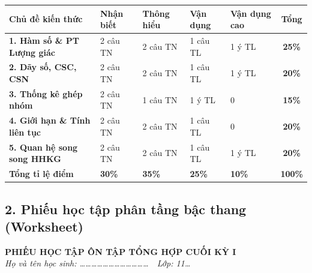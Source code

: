 \documentclass[12pt, a4paper]{article}
\begin{document}
\begin{center}
\renewcommand{\arraystretch}{1.25}
\begin{tabularx}{\textwidth}{|p{4.2cm}|X|X|X|X|c|}
    \hline
    \textbf{Chủ đề kiến thức} & \textbf{Nhận biết} & \textbf{Thông hiểu} & \textbf{Vận dụng} & \textbf{Vận dụng cao} & \textbf{Tổng} \\
    \hline
    \textbf{1. Hàm số \& PT Lượng giác} & 2 câu TN & 2 câu TN & 1 câu TL & 1 ý TL & \textbf{25\%} \\
    \hline
    \textbf{2. Dãy số, CSC, CSN} & 2 câu TN & 2 câu TN & 1 câu TL & 1 ý TL & \textbf{20\%} \\
    \hline
    \textbf{3. Thống kê ghép nhóm} & 2 câu TN & 1 câu TN & 1 ý TL & 0 & \textbf{15\%} \\
    \hline
    \textbf{4. Giới hạn \& Tính liên tục} & 2 câu TN & 2 câu TN & 1 câu TL & 0 & \textbf{20\%} \\
    \hline
    \textbf{5. Quan hệ song song HHKG} & 2 câu TN & 2 câu TN & 1 câu TL & 1 ý TL & \textbf{20\%} \\
    \hline
    \textbf{Tổng tỉ lệ điểm} & \textbf{30\%} & \textbf{35\%} & \textbf{25\%} & \textbf{10\%} & \textbf{100\%} \\
    \hline
\end{tabularx}
\end{center}

\subsection*{2. Phiếu học tập phân tầng bậc thang (Worksheet)}

\begin{center}
    \textbf{PHIẾU HỌC TẬP ÔN TẬP TỔNG HỢP CUỐI KỲ I}\\
    \textit{Họ và tên học sinh: \dots\dots\dots\dots\dots\dots\dots\dots\dots\dots\dots\dots \ \textbar \ Lớp: 11\dots}
\end{center}
\end{document}
